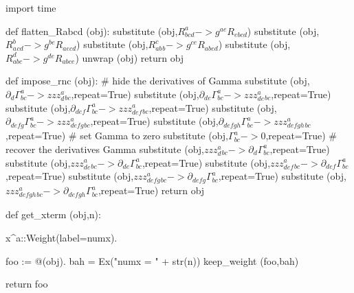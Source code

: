 \documentclass[12pt]{cdblatex}
\begin{document}
\begin{cadabra}
   import time

   def flatten_Rabcd (obj):
       substitute (obj,$R^{a}_{b c d}   -> g^{a e} R_{e b c d}$)
       substitute (obj,$R_{a}^{b}_{c d} -> g^{b e} R_{a e c d}$)
       substitute (obj,$R_{a b}^{c}_{b} -> g^{c e} R_{a b e d}$)
       substitute (obj,$R_{a b c}^{d}   -> g^{d e} R_{a b c e}$)
       unwrap     (obj)
       return obj

   def impose_rnc (obj):
       # hide the derivatives of Gamma
       substitute (obj,$\partial_{d}{\Gamma^{a}_{b c}} -> zzz_{d}^{a}_{b c}$,repeat=True)
       substitute (obj,$\partial_{d e}{\Gamma^{a}_{b c}} -> zzz_{d e}^{a}_{b c}$,repeat=True)
       substitute (obj,$\partial_{d e f}{\Gamma^{a}_{b c}} -> zzz_{d e f}^{a}_{b c}$,repeat=True)
       substitute (obj,$\partial_{d e f g}{\Gamma^{a}_{b c}} -> zzz_{d e f g}^{a}_{b c}$,repeat=True)
       substitute (obj,$\partial_{d e f g h}{\Gamma^{a}_{b c}} -> zzz_{d e f g h}^{a}_{b c}$,repeat=True)
       # set Gamma to zero
       substitute (obj,$\Gamma^{a}_{b c} -> 0$,repeat=True)
       # recover the derivatives Gamma
       substitute (obj,$zzz_{d}^{a}_{b c} -> \partial_{d}{\Gamma^{a}_{b c}}$,repeat=True)
       substitute (obj,$zzz_{d e}^{a}_{b c} -> \partial_{d e}{\Gamma^{a}_{b c}}$,repeat=True)
       substitute (obj,$zzz_{d e f}^{a}_{b c} -> \partial_{d e f}{\Gamma^{a}_{b c}}$,repeat=True)
       substitute (obj,$zzz_{d e f g}^{a}_{b c} -> \partial_{d e f g}{\Gamma^{a}_{b c}}$,repeat=True)
       substitute (obj,$zzz_{d e f g h}^{a}_{b c} -> \partial_{d e f g h}{\Gamma^{a}_{b c}}$,repeat=True)
       return obj

   def get_xterm (obj,n):

       x^{a}::Weight(label=numx).

       foo := @(obj).
       bah  = Ex("numx = " + str(n))
       keep_weight (foo,bah)

       return foo


\end{cadabra}
\end{document}
